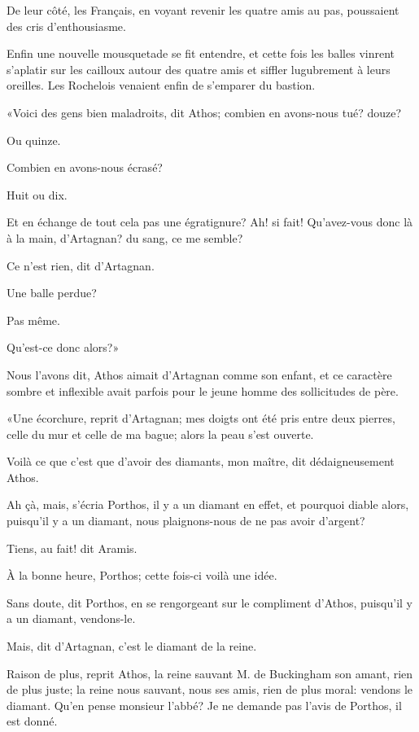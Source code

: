 De leur côté, les Français, en voyant revenir les quatre amis au pas, poussaient des cris d'enthousiasme. 

Enfin une nouvelle mousquetade se fit entendre, et cette fois les balles vinrent s'aplatir sur les cailloux autour des quatre amis et siffler lugubrement à leurs oreilles. Les Rochelois venaient enfin de s'emparer du bastion. 

«Voici des gens bien maladroits, dit Athos; combien en avons-nous tué? douze? 

\speak  Ou quinze. 

\speak  Combien en avons-nous écrasé? 

\speak  Huit ou dix. 

\speak  Et en échange de tout cela pas une égratignure? Ah! si fait! Qu'avez-vous donc là à la main, d'Artagnan? du sang, ce me semble? 

\speak  Ce n'est rien, dit d'Artagnan. 

\speak  Une balle perdue? 

\speak  Pas même. 

\speak  Qu'est-ce donc alors?» 

Nous l'avons dit, Athos aimait d'Artagnan comme son enfant, et ce caractère sombre et inflexible avait parfois pour le jeune homme des sollicitudes de père. 

«Une écorchure, reprit d'Artagnan; mes doigts ont été pris entre deux pierres, celle du mur et celle de ma bague; alors la peau s'est ouverte. 

\speak  Voilà ce que c'est que d'avoir des diamants, mon maître, dit dédaigneusement Athos. 

\speak  Ah çà, mais, s'écria Porthos, il y a un diamant en effet, et pourquoi diable alors, puisqu'il y a un diamant, nous plaignons-nous de ne pas avoir d'argent? 

\speak  Tiens, au fait! dit Aramis. 

\speak  À la bonne heure, Porthos; cette fois-ci voilà une idée. 

\speak  Sans doute, dit Porthos, en se rengorgeant sur le compliment d'Athos, puisqu'il y a un diamant, vendons-le. 

\speak  Mais, dit d'Artagnan, c'est le diamant de la reine. 

\speak  Raison de plus, reprit Athos, la reine sauvant M. de Buckingham son amant, rien de plus juste; la reine nous sauvant, nous ses amis, rien de plus moral: vendons le diamant. Qu'en pense monsieur l'abbé? Je ne demande pas l'avis de Porthos, il est donné. 

